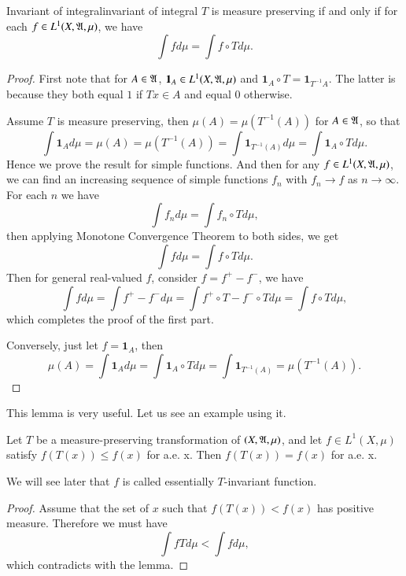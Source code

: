 \documentclass[12pt,a4paper]{article}
\begin{document}
 		\newcommand{\one}{\mathbf{1}}
 
 	\begin{lemma}{Invariant of integral}{invariant of integral}
 		$T$ is measure preserving if and only if for each $f\in L^1 (X,\mathfrak{A},\mu)$, we have
 		$$
 		\int f d\mu=\int f\circ Td\mu.
 		$$
 	\end{lemma}
 	\begin{proof}
 		First note that for $A\in\mathfrak{A}$, $\one_A\in L^1(X,\frakA,\mu)$ and $\one_A\circ T=\one_{T^{-1}A}$. The latter is because they both equal $1$ if $Tx\in A$ and equal $0$ otherwise. 
 		
 		Assume $T$ is measure preserving, then $\mu(A)=\mu(T^{-1}(A))$ for $A\in \mathfrak{A}$, so that
 		$$
 		\int \one_A d\mu=\mu(A)=\mu(T^{-1}(A))=\int \one_{T^{-1}(A)} d\mu =\int \one_A\circ Td\mu.
 		$$
 		Hence we prove the result for simple functions. And then for any $f\in L^1(X,\mathfrak{A},\mu)$, we can find an increasing sequence of simple functions $f_n$ with $f_n\to f$ as $n\to \infty$. For each $n$ we have
 		$$
 		\int f_n d\mu =\int f_n \circ T d\mu,
 		$$
 		then applying Monotone Convergence Theorem to both sides, we get
 		$$
 		\int fd\mu=\int f\circ T d\mu.
 		$$
 		Then for general real-valued $f$, consider $f=f^{+} - f^{-}$, we have
 		$$
 		\int f d\mu= \int f^{+}- f^{-}d\mu=\int f^{+}\circ T-f^{-}\circ Td\mu=\int f\circ Td\mu,
 		$$
 		which completes the proof of the first part.
 		
 		Conversely, just let $f=\one_A$, then
 		$$
 		\mu(A)=\int \one_Ad\mu =\int \one_A \circ Td\mu=\int \one_{T^{-1}(A)}=\mu(T^{-1}(A)).
 		$$
 	\end{proof}
 	This lemma is very useful. Let us see an example using it.
 	
 	\begin{example}{}{}
 		Let $T$ be a measure-preserving transformation of $(X,\mathfrak{A},\mu)$, and let $f\in L^1(X,\mu)$ satisfy $f(T(x))\leq f(x)$ for a.e. x. Then $f(T(x))=f(x)$ for a.e. x.
 	\end{example}
 	We will see later that $f$ is called essentially $T$-invariant function.
 	\begin{proof}
 		Assume that the set of $x$ such that $f(T(x))<f(x)$ has positive measure. Therefore we must have
 		$$
 		\int fT d\mu <\int fd\mu,
 		$$
 		which contradicts with the lemma.
 	\end{proof}
 
\end{document}
